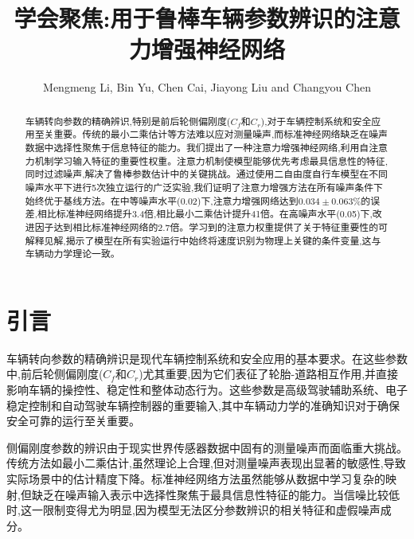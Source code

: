\documentclass[Afour,sageh,times]{sagej}
\begin{document}

\title{学会聚焦:用于鲁棒车辆参数辨识的注意力增强神经网络}

\author{Mengmeng Li, Bin Yu, Chen Cai, Jiayong Liu and Changyou Chen }




\begin{abstract}
车辆转向参数的精确辨识,特别是前后轮侧偏刚度($C_f$和$C_r$),对于车辆控制系统和安全应用至关重要。传统的最小二乘估计等方法难以应对测量噪声,而标准神经网络缺乏在噪声数据中选择性聚焦于信息特征的能力。我们提出了一种注意力增强神经网络,利用自注意力机制学习输入特征的重要性权重。注意力机制使模型能够优先考虑最具信息性的特征,同时过滤噪声,解决了鲁棒参数估计中的关键挑战。通过使用二自由度自行车模型在不同噪声水平下进行5次独立运行的广泛实验,我们证明了注意力增强方法在所有噪声条件下始终优于基线方法。在中等噪声水平(0.02)下,注意力增强网络达到$0.034 \pm 0.063$\%的误差,相比标准神经网络提升3.4倍,相比最小二乘估计提升41倍。在高噪声水平(0.05)下,改进因子达到相比标准神经网络的2.7倍。学习到的注意力权重提供了关于特征重要性的可解释见解,揭示了模型在所有实验运行中始终将速度识别为物理上关键的条件变量,这与车辆动力学理论一致。
\end{abstract}


\maketitle

\section{引言}
\label{sec:intro}

车辆转向参数的精确辨识是现代车辆控制系统和安全应用的基本要求。在这些参数中,前后轮侧偏刚度($C_f$和$C_r$)尤其重要,因为它们表征了轮胎-道路相互作用,并直接影响车辆的操控性、稳定性和整体动态行为。这些参数是高级驾驶辅助系统、电子稳定控制和自动驾驶车辆控制器的重要输入,其中车辆动力学的准确知识对于确保安全可靠的运行至关重要\citep{rajamani2012vehicle}。

侧偏刚度参数的辨识由于现实世界传感器数据中固有的测量噪声而面临重大挑战。传统方法如最小二乘估计,虽然理论上合理,但对测量噪声表现出显著的敏感性,导致实际场景中的估计精度下降。标准神经网络方法虽然能够从数据中学习复杂的映射,但缺乏在噪声输入表示中选择性聚焦于最具信息性特征的能力。当信噪比较低时,这一限制变得尤为明显,因为模型无法区分参数辨识的相关特征和虚假噪声成分。
\end{document}
